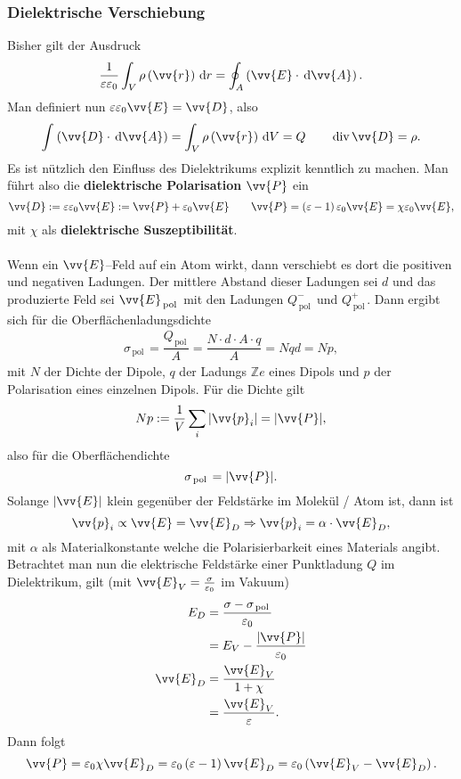 \subsubsection{Dielektrische Verschiebung}
Bisher gilt der Ausdruck
\[ 
        \dfrac{1}{\varepsilon \varepsilon _0}\int_{V}^{}\rho \left(\vv{r}\right)\td r=\oint_{A}^{}\left(\vv{E}\cdot \td\vv{A}\right) 
.\] 
Man definiert nun $\varepsilon \varepsilon _0\vv{E}=\vv{D}$, also
\[ 
        \int_{}^{}\left(\vv{D}\cdot \td \vv{A}\right)=\int_{V}^{}\rho \left(\vv{r}\right)\td V=Q \qquad \,\text{div}\,\vv{D}=\rho 
.\] 
Es ist nützlich den Einfluss des Dielektrikums explizit kenntlich zu machen. Man führt also die \textbf{dielektrische Polarisation} $\vv{P}$ ein
\[ 
        \vv{D}:=\varepsilon \varepsilon _0\vv{E}:=\vv{P}+\varepsilon _0\vv{E}\qquad \vv{P}=\left(\varepsilon -1\right)\varepsilon _0\vv{E}=\chi \varepsilon _0\vv{E}
,\] 
mit $\chi$ als \textbf{dielektrische Suszeptibilität}.\\\\\indent
Wenn ein $\vv{E}$--Feld auf ein Atom wirkt, dann verschiebt es dort die positiven und negativen Ladungen. Der mittlere Abstand dieser Ladungen sei $d$ und das produzierte Feld sei $\vv{E}_{\,\text{pol}\,}$ mit den Ladungen $Q^-_{\,\text{pol}\,}$ und $Q^+_{\,\text{pol}\,}$. Dann ergibt sich für die Oberflächenladungsdichte
\begin{align*}
        \sigma _{\,\text{pol}\,}=\dfrac{Q_{\,\text{pol}\,}}{A}=\dfrac{N\cdot d\cdot A\cdot q}{A}=Nqd=Np
,\end{align*}
mit $N$ der Dichte der Dipole, $q$ der Ladungs $\mathbb{Z}e$ eines Dipols und $p$ der Polarisation eines einzelnen Dipols. Für die Dichte gilt
\[ 
        Np:=\dfrac{1}{V}\sum_{i}^{}|\vv{p}_i|=|\vv{P}|
,\] 
also für die Oberflächendichte
\[ 
        \sigma _{\,\text{pol}\,}=|\vv{P}|
.\] 
Solange $|\vv{E}|$ klein gegenüber der Feldstärke im Molekül / Atom ist, dann ist
\[ 
        \vv{p}_i\propto \vv{E}=\vv{E}_D\Rightarrow \vv{p}_i=\alpha \cdot \vv{E}_D
,\] 
mit $\alpha $ als Materialkonstante welche die Polarisierbarkeit eines Materials angibt.\\\indent
Betrachtet man nun die elektrische Feldstärke einer Punktladung $Q$ im Dielektrikum, gilt (mit $\vv{E}_V=\tfrac{\sigma }{\varepsilon _0}$ im Vakuum)
\begin{align*}
        E_D&=\dfrac{\sigma -\sigma _{\,\text{pol}\,}}{\varepsilon _0}\\
           &=E_V-\dfrac{|\vv{P}|}{\varepsilon _0}\\
        \vv{E}_D&=\dfrac{\vv{E}_V}{1+\chi}\\
                &=\dfrac{\vv{E}_V}{\varepsilon }
.\end{align*}
Dann folgt
\[ 
        \vv{P}=\varepsilon _0\chi\vv{E}_D=\varepsilon _0\left(\varepsilon -1\right)\vv{E}_D=\varepsilon _0\left(\vv{E}_V-\vv{E}_D\right)
.\] 

